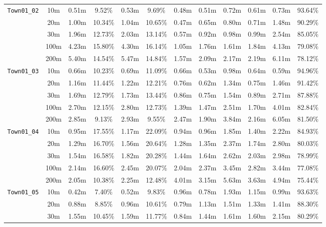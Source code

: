 \begin{table}
{\begin{tabular}{@{}cccccccccccc@{}}
      \midrule
      \multirow{5}{*}{\Verb|Town01_02|} & 10m & 0.51m & 9.52\% & 0.53m & 9.69\% & 0.48m & 0.51m & 0.72m & 0.61m & 0.73m & 93.64\% \\
      & 20m & 1.00m & 10.34\% & 1.04m & 10.65\% & 0.47m & 0.65m & 0.80m & 0.71m & 1.48m & 90.29\% \\
      & 30m & 1.96m & 12.73\% & 2.03m & 13.14\% & 0.57m & 0.92m & 0.98m & 0.99m & 2.54m & 85.05\% \\
      & 100m & 4.23m & 15.80\% & 4.30m & 16.14\% & 1.05m & 1.76m & 1.61m & 1.84m & 4.13m & 79.08\% \\
      & 200m & 5.40m & 14.54\% & 5.47m & 14.84\% & 1.57m & 2.09m & 2.17m & 2.19m & 6.11m & 78.12\% \\
      \midrule
      \multirow{5}{*}{\Verb|Town01_03|} & 10m & 0.66m & 10.23\% & 0.69m & 11.09\% & 0.66m & 0.53m & 0.98m & 0.64m & 0.59m & 94.96\% \\
      & 20m & 1.16m & 11.44\% & 1.22m & 12.21\% & 0.76m & 0.62m & 1.34m & 0.75m & 1.46m & 91.42\% \\
      & 30m & 1.69m & 12.79\% & 1.73m & 13.44\% & 0.86m & 0.75m & 1.54m & 0.89m & 2.71m & 87.88\% \\
      & 100m & 2.70m & 12.15\% & 2.80m & 12.73\% & 1.39m & 1.47m & 2.51m & 1.70m & 4.01m & 82.84\% \\
      & 200m & 2.85m & 9.13\% & 2.93m & 9.55\% & 2.47m & 1.90m & 3.84m & 2.16m & 6.05m & 81.50\% \\
      \midrule
      \multirow{5}{*}{\Verb|Town01_04|} & 10m & 0.95m & 17.55\% & 1.17m & 22.09\% & 0.94m & 0.96m & 1.85m & 1.40m & 2.22m & 84.93\% \\
      & 20m & 1.29m & 16.70\% & 1.56m & 20.64\% & 1.28m & 1.35m & 2.37m & 1.74m & 2.80m & 80.03\% \\
      & 30m & 1.54m & 16.58\% & 1.82m & 20.28\% & 1.44m & 1.64m & 2.62m & 2.03m & 2.98m & 78.99\% \\
      & 100m & 2.14m & 16.60\% & 2.45m & 20.07\% & 2.04m & 2.37m & 3.45m & 2.82m & 3.44m & 77.08\% \\
      & 200m & 2.05m & 10.38\% & 2.25m & 12.48\% & 4.01m & 3.15m & 5.63m & 3.63m & 4.94m & 75.44\% \\
      \midrule
      \multirow{5}{*}{\Verb|Town01_05|} & 10m & 0.42m & 7.40\% & 0.52m & 9.83\% & 0.96m & 0.78m & 1.93m & 1.15m & 0.99m & 93.63\% \\
      & 20m & 0.88m & 8.85\% & 0.96m & 10.61\% & 0.79m & 1.13m & 1.51m & 1.33m & 1.41m & 88.30\% \\
      & 30m & 1.55m & 10.45\% & 1.59m & 11.77\% & 0.84m & 1.44m & 1.61m & 1.60m & 2.15m & 80.29\% \\

\end{tabular}}
\end{table}
